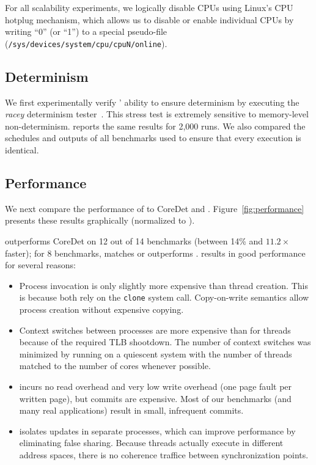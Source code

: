 For all scalability experiments, we logically disable CPUs using
Linux's CPU hotplug mechanism, which allows us to disable or enable
individual CPUs by writing ``0'' (or ``1'') to a special pseudo-file
(\texttt{/sys/devices/system/cpu/cpuN/online}).

\subsection{Determinism}

We first experimentally verify \dthreads{}' ability to ensure
determinism by executing the \emph{racey} determinism
tester~\cite{1508256}. This stress test is extremely sensitive to
memory-level non-determinism. \dthreads{} reports the same results for
2,000 runs.  We also compared the schedules and outputs of all benchmarks used
to ensure that every execution is identical.

\subsection{Performance}
\label{sec:performance}

We next compare the performance of \dthreads{} to CoreDet
and \pthreads{}. Figure~\ref{fig:performance} presents these results
graphically (normalized to \pthreads{}).


\dthreads{} outperforms CoreDet on 12 out
of 14 benchmarks (between 14\% and $11.2\times$ faster); 
for 8 benchmarks, \dthreads{} matches or outperforms \pthreads{}.  \dthreads{} results in good performance for several reasons:

\begin{itemize}
	\item Process invocation is only slightly more expensive than thread
	creation.  This is because both rely on the \texttt{clone} system call.
	Copy-on-write semantics allow process creation without expensive copying.

	\item Context switches between processes are more expensive than for threads 
	because of the required TLB shootdown.  The number of context switches was minimized by running on a quiescent system with the number of threads matched to the number of cores whenever possible.

	\item \dthreads{} incurs no read overhead and very
	low write overhead (one page fault per written page), but commits are 	expensive.  Most of our benchmarks (and many real applications) result in 
	small, infrequent commits.

	\item \dthreads{} isolates updates in separate processes, which can improve performance by eliminating false sharing.  Because threads actually execute in different address spaces, there is no coherence traffice between synchronization points.
\end{itemize}

